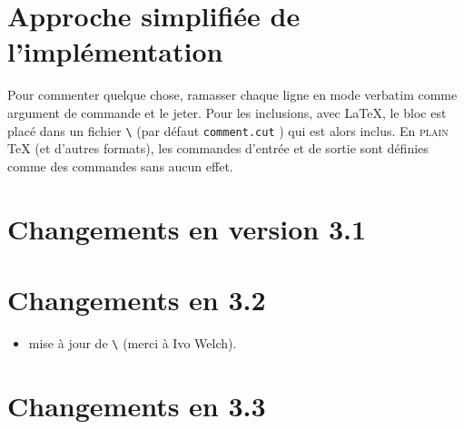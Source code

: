 \documentclass[parskip=false, DIV=8, headings=normal, pagesize=auto]{scrartcl}
\makeatletter
\newcommand*{\cs}[1]{\texttt{\textbackslash#1}}
\newcommand*{\cmd}[1]{\cs{\expandafter\@gobble\string#1}}
\newcommand*{\meta}[1]{\textlangle\textsl{#1}\textrangle}
\newcommand*{\marg}[1]{\texttt{\{}\meta{#1}\texttt{\}}}
\makeatother
\begin{document}
\section{Approche simplifiée de l'implémentation}

Pour commenter quelque chose, ramasser chaque ligne en mode verbatim comme 
argument de commande et le jeter. 
Pour les inclusions, avec \LaTeX, le bloc est placé dans un fichier 
\cmd{\CommentCutFile} (par défaut \og \texttt{comment.cut} \fg) qui est alors
inclus.
En \textsc{plain} TeX (et d'autres formats), les commandes d'entrée et de
sortie sont définies comme des commandes sans aucun effet.

\section{Changements en version 3.1}



\section{Changements en 3.2}

\begin{itemize}
\item mise à jour de \cmd{\specialcomment} (merci à Ivo Welch).
\end{itemize}


\section{Changements en 3.3}
\end{document}
